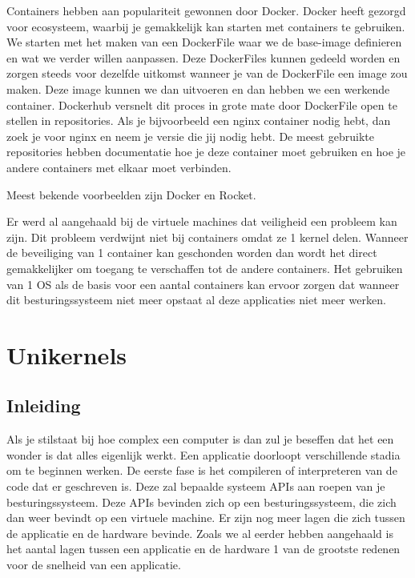 \documentclass[pdftex,a4paper,12pt,twoside]{report}
\begin{document}
Containers hebben aan populariteit gewonnen door Docker. Docker heeft gezorgd voor ecosysteem, waarbij je gemakkelijk kan starten met containers te gebruiken. 
We starten met het maken van een DockerFile waar we de base-image definieren en wat we verder willen aanpassen. Deze DockerFiles kunnen gedeeld worden en zorgen steeds voor dezelfde uitkomst wanneer je van de DockerFile een image zou maken. Deze image kunnen we dan uitvoeren en dan hebben we een werkende container.
Dockerhub versnelt dit proces in grote mate door DockerFile open te stellen in repositories. Als je bijvoorbeeld een nginx container nodig hebt, dan zoek je voor nginx en neem je versie die jij nodig hebt. De meest gebruikte repositories hebben documentatie hoe je deze container moet gebruiken en hoe je andere containers met elkaar moet verbinden. 

Meest bekende voorbeelden zijn Docker en Rocket.

Er werd al aangehaald bij de virtuele machines dat veiligheid een probleem kan zijn. Dit probleem verdwijnt niet bij containers omdat ze 1 kernel delen. Wanneer de beveiliging van 1 container kan geschonden worden dan wordt het direct gemakkelijker om toegang te verschaffen tot de andere containers. Het gebruiken van 1 OS als de basis voor een aantal containers kan ervoor zorgen dat wanneer dit besturingssysteem niet meer opstaat al deze applicaties niet meer werken.

\chapter{Unikernels}
\label{ch:unikernels}

\section{Inleiding}

Als je stilstaat bij hoe complex een computer is dan zul je beseffen dat het een wonder is dat alles eigenlijk werkt.
Een applicatie doorloopt verschillende stadia om te beginnen werken. De eerste fase is het compileren of interpreteren van de code dat er geschreven is.
Deze zal bepaalde systeem APIs aan roepen van je besturingssysteem.
Deze APIs bevinden zich op een besturingssysteem, die zich dan weer bevindt op een virtuele machine.
Er zijn nog meer lagen die zich tussen de applicatie en de hardware bevinde.
Zoals we al eerder hebben aangehaald is het aantal lagen tussen een applicatie en de hardware 1 van de grootste redenen voor de snelheid van een applicatie.
\end{document}
